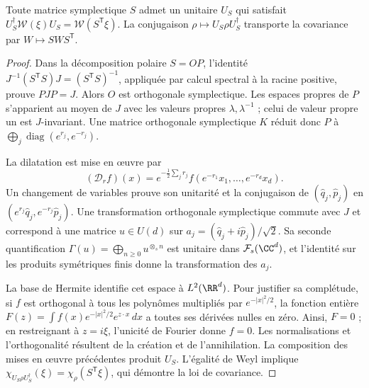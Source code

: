 \begin{lemma}
\label{x_reciprocidad:app:lem:implementacion-simplectica}
Toute matrice symplectique \(S\) admet un unitaire \(U_S\) qui satisfait
\(U_S^\dagger\mathcal W(\xi)U_S=\mathcal W(S^{\mathsf T}\xi)\).
La conjugaison \(\rho\mapsto U_S\rho U_S^\dagger\) transporte
la covariance par \(W\mapsto SWS^{\mathsf T}\).
\end{lemma}
\begin{proof}
Dans la décomposition polaire \(S=OP\), l’identité
\(J^{-1}(S^{\mathsf T}S)J=(S^{\mathsf T}S)^{-1}\), appliquée par
calcul spectral à la racine positive, prouve \(PJP=J\).
Alors \(O\) est orthogonale symplectique. Les espaces propres de \(P\)
s’apparient au moyen de \(J\) avec les valeurs propres \(\lambda,\lambda^{-1}\) ;
celui de valeur propre un est \(J\)-invariant. Une matrice
orthogonale symplectique \(K\) réduit donc \(P\) à
\(\bigoplus_j\operatorname{diag}(e^{r_j},e^{-r_j})\).

La dilatation est mise en œuvre par
\[
 (\mathcal D_rf)(x)=e^{-\frac12\sum_jr_j}
 f(e^{-r_1}x_1,\ldots,e^{-r_d}x_d).
\]
Un changement de variables prouve son unitarité et la conjugaison de
\((\widehat q_j,\widehat p_j)\) en
\((e^{r_j}\widehat q_j,e^{-r_j}\widehat p_j)\).
Une transformation orthogonale symplectique commute avec \(J\) et
correspond à une matrice \(u\in U(d)\) sur
\(a_j=(\widehat q_j+i\widehat p_j)/\sqrt2\). Sa seconde
quantification \(\Gamma(u)=\bigoplus_{n\geq0}u^{\otimes_s n}\)
est unitaire dans \(\mathcal F_s(\CC^d)\), et l’identité sur les
produits symétriques finis donne la transformation des \(a_j\).

La base de Hermite identifie cet espace à \(L^2(\RR^d)\).
Pour justifier sa complétude, si \(f\) est orthogonal à tous les
polynômes multipliés par \(e^{-|x|^2/2}\), la fonction entière
\(F(z)=\int f(x)e^{-|x|^2/2}e^{z\cdot x}\,dx\) a toutes
ses dérivées nulles en zéro. Ainsi, \(F=0\) ; en restreignant à
\(z=i\xi\), l’unicité de Fourier donne \(f=0\). Les
normalisations et l’orthogonalité résultent de la création et de l’annihilation.
La composition des mises en œuvre précédentes produit \(U_S\).
L’égalité de Weyl implique
\(\chi_{U_S\rho U_S^\dagger}(\xi)=\chi_\rho(S^{\mathsf T}\xi)\),
qui démontre la loi de covariance.
\end{proof}

